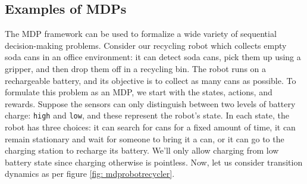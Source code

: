 \documentclass[12pt]{article}
\begin{document}
\subsection{Examples of MDPs}
The MDP framework can be used to formalize a wide variety of sequential decision-making problems.
Consider our recycling robot which collects empty soda cans in an office environment: it can detect soda cans, pick them up using a gripper, and then drop them off in a recycling bin. The robot runs on a rechargeable battery, and its objective is to collect as many cans as possible. To formulate this problem as an MDP, we start with the states, actions, and rewards. Suppose the sensors can only distinguish between two levels of battery charge: \texttt{high} and \texttt{low}, and these represent the robot's state. In each state, the robot has three choices: it can search for cans for a fixed amount of time, it can remain stationary and wait for someone to bring it a can, or it can go to the charging station to recharge its battery. We'll only allow charging from low battery state since charging otherwise is pointless. Now, let us consider transition dynamics as per figure \ref{fig: mdprobotrecycler}.
\end{document}

